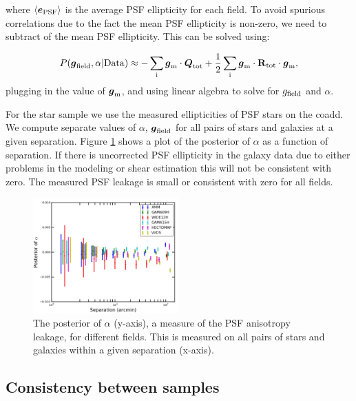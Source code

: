 \documentclass[useAMS,usenatbib]{mnras}
\newcommand{\vecg}{\mbox{\boldmath $g$}}
\newcommand{\vece}{\mbox{\boldmath $e$}}
\newcommand{\vecQ}{\mbox{\boldmath $Q$}}
\newcommand{\matR}{\mbox{$\bf R$}}
\begin{document}
where $\langle\vece_{\rm PSF}\rangle$ is the average PSF ellipticity for each field. To avoid spurious correlations due to the fact the mean PSF ellipticity is non-zero, we need to subtract of the mean PSF ellipticity.  This can be solved using:

\begin{multline}
P(\vecg_{\rm{field}},\alpha|\rm{Data}) \approx -\sum_i \vecg_{\rm m}\cdot \vecQ_{\rm tot}
+ \frac{1}{2}\sum_i  \vecg_{\rm m}\cdot \matR_{\rm tot}
\cdot \vecg_{\rm m},
\end{multline}
plugging in the value of $\vecg_{\rm m}$, and using linear algebra to solve for $g_{\rm field}$ and $\alpha$.

For the star sample we use the measured ellipticities of PSF stars on the coadd.  We compute separate values of $\alpha$, $\vecg_{\rm {field}}$ for all pairs of stars and galaxies at a given separation.   Figure \ref{fig:alpha} shows a plot of the posterior of $\alpha$ as a function of separation.  If there is uncorrected PSF ellipticity in the galaxy data due to either problems in the modeling or shear estimation this will not be consistent with zero.  The measured PSF leakage is small or consistent with zero for all fields.  

\begin{figure}
    \includegraphics[width=0.5\textwidth]{alpha.png}
    \caption{
    The posterior of $\alpha$ (y-axis), a measure of the PSF anisotropy leakage, for different fields.  This is measured on all pairs of stars and galaxies within a given separation (x-axis).
    }
    \label{fig:alpha}
\end{figure}

\subsection{Consistency between samples}
\label{Sec:Data:Samples}
\end{document}
